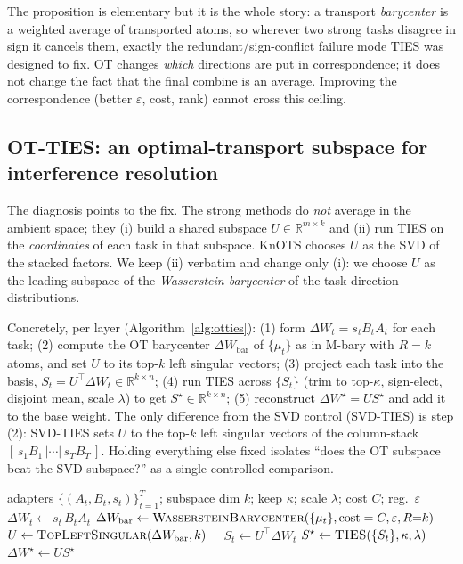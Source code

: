 \documentclass[11pt]{article}
\newcommand{\dW}{\Delta W}
\newcommand{\R}{\mathbb{R}}
\newcommand{\otties}{\textsc{OT-TIES}}
\newcommand{\svdties}{\textsc{SVD-TIES}}
\begin{document}
\noindent The proposition is elementary but it is the whole story: a transport \emph{barycenter} is a
weighted average of transported atoms, so wherever two strong tasks disagree in sign it cancels them,
exactly the redundant/sign-conflict failure mode TIES was designed to fix. OT changes \emph{which}
directions are put in correspondence; it does not change the fact that the final combine is an average.
Improving the correspondence (better $\varepsilon$, cost, rank) cannot cross this ceiling.

\subsection{OT-TIES: an optimal-transport subspace for interference resolution}
\label{sec:method-otties}
The diagnosis points to the fix. The strong methods do \emph{not} average in the ambient space; they
(i) build a shared subspace $U\in\R^{m\times k}$ and (ii) run TIES on the \emph{coordinates} of each task
in that subspace. KnOTS chooses $U$ as the SVD of the stacked factors. We keep (ii) verbatim and change
only (i): we choose $U$ as the leading subspace of the \emph{Wasserstein barycenter} of the task
direction distributions.

Concretely, per layer (Algorithm~\ref{alg:otties}): (1) form $\dW_t = s_t B_t A_t$ for each task;
(2) compute the OT barycenter $\dW_{\text{bar}}$ of $\{\mu_t\}$ as in M-bary with $R=k$ atoms, and set $U$
to its top-$k$ left singular vectors; (3) project each task into the basis, $S_t = U^\top \dW_t \in
\R^{k\times n}$; (4) run TIES across $\{S_t\}$ (trim to top-$\kappa$, sign-elect, disjoint mean, scale
$\lambda$) to get $S^\star\in\R^{k\times n}$; (5) reconstruct $\dW^\star = U S^\star$ and add it to the
base weight. The only difference from the SVD control (\svdties{}) is step (2): \svdties{} sets $U$ to the
top-$k$ left singular vectors of the column-stack $[\,s_1B_1\,|\cdots|\,s_TB_T\,]$. Holding everything
else fixed isolates ``does the OT subspace beat the SVD subspace?'' as a single controlled comparison.

\begin{algorithm}[t]
\caption{\otties{} (per layer)}
\label{alg:otties}
\begin{algorithmic}[1]
\Require adapters $\{(A_t,B_t,s_t)\}_{t=1}^T$; subspace dim $k$; keep $\kappa$; scale $\lambda$;
cost $C$; reg.\ $\varepsilon$
\State $\dW_t \gets s_t\,B_t A_t$ 
\State $\dW_{\text{bar}} \gets \textsc{WassersteinBarycenter}(\{\mu_t\}, \text{cost}=C, \varepsilon, R{=}k)$
\State $U \gets \textsc{TopLeftSingular}(\dW_{\text{bar}}, k)$ 
 \ \ $S_t \gets U^\top \dW_t$ \EndFor {}
\State $S^\star \gets \textsc{TIES}(\{S_t\}, \kappa, \lambda)$ 
\State \Return $\dW^\star \gets U S^\star$
\end{algorithmic}
\end{algorithm}
\end{document}
